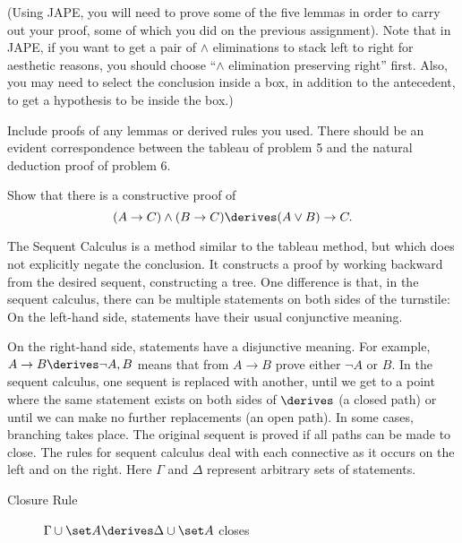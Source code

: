 \documentclass{cs81-homework}
\begin{document}
\begin{enumerate}
  (Using JAPE, you will need to prove some of the five lemmas in order to carry
  out your proof, some of which you did on the previous assignment). Note that
  in JAPE, if you want to get a pair of \(\land\) eliminations to stack left to
  right for aesthetic reasons, you should choose “\(\land\) elimination
  preserving right” first. Also, you may need to select the conclusion inside a
  box, in addition to the antecedent, to get a hypothesis to be inside the box.)

  Include proofs of any lemmas or derived rules you used.  There should be an
  evident correspondence between the tableau of problem 5 and the natural
  deduction proof of problem 6.

  \begin{solution}
  \end{solution}

 Show that there is a constructive proof of
  \[
    (A \to C) \land (B \to C) \derives (A \lor B) \to C.
  \]

  \begin{solution}
  \end{solution}

 The Sequent Calculus is a method similar to the tableau
  method, but which does not explicitly negate the conclusion. It constructs a
  proof by working backward from the desired sequent, constructing a tree. One
  difference is that, in the sequent calculus, there can be multiple statements
  on both sides of the turnstile: On the left-hand side, statements have their
  usual conjunctive meaning.


  On the right-hand side, statements have a disjunctive meaning. For example,
  \(A \to B \derives \neg A, B\) means that from \(A \to B\) prove either
  \(\neg A\) or \(B\).  In the sequent calculus, one sequent is replaced with
  another, until we get to a point where the same statement exists on both sides
  of \(\derives\) (a closed path) or until we can make no further replacements
  (an open path).  In some cases, branching takes place. The original sequent is
  proved if all paths can be made to close.  The rules for sequent calculus deal
  with each connective as it occurs on the left and on the right. Here \(\Gamma\) and \(\Delta\)
  represent arbitrary sets of statements.

  \begin{description}
  \item[Closure Rule] \(\Gamma \cup \set A \derives \Delta \cup \set A\) closes \\


\end{description}
\end{enumerate}
\end{document}
